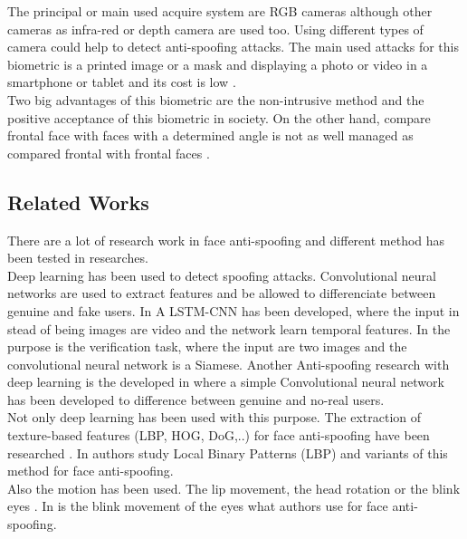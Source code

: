 The principal or main used acquire system are RGB cameras although other cameras as infra-red  or depth camera are used too. Using different types of camera could help to detect anti-spoofing attacks. The main used attacks for this biometric is a printed image or a mask and displaying a photo or video in a smartphone or tablet and its cost is low \cite{distorsion}.\\

Two big advantages of this biometric are the non-intrusive method and the positive acceptance of this biometric in society. On the other hand, compare frontal face with faces with a determined angle is not as well managed as compared frontal with frontal faces \cite{survey2}.\\

\subsection{Related Works}
There are a lot of research work in face anti-spoofing and different method has been tested in researches.\\

Deep learning has been used to detect spoofing attacks. Convolutional neural networks are used to extract features and be allowed to differenciate between genuine and fake users. In \cite{LSTM-CNN} A LSTM-CNN has been developed, where the input in stead of being images are video and the network learn temporal features. In \cite{Verification} the purpose is the verification task, where the input are two images and the convolutional neural network is a Siamese. Another Anti-spoofing research with deep learning is the developed in \cite{yangLL14} where a simple Convolutional neural network has been developed to difference between genuine and no-real users.\\

Not only deep learning has been used with this purpose. The extraction of texture-based features (LBP, HOG, DoG,..) for face anti-spoofing have been researched \cite{distorsion}. In \cite{LBP_FaceAnti} authors study Local Binary Patterns (LBP) and variants of this method for face anti-spoofing.\\

Also the motion has been used. The lip movement, the head rotation or the blink eyes \cite{distorsion}. In \cite{Blink_antispoofing} is the blink movement of the eyes what authors use for face anti-spoofing.\\
